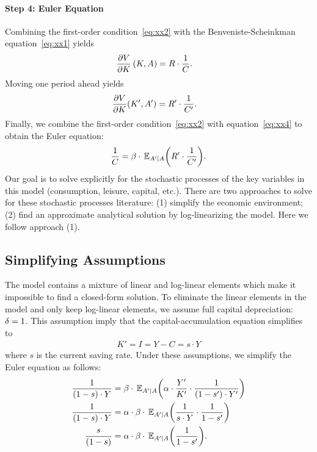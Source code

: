 \documentclass[letterpaper,12pt,leqno]{article}
\begin{document}
\paragraph{Step 4: Euler Equation} Combining the first-order condition~\eqref{eq:xx2} with the Benveniste-Scheinkman equation~\eqref{eq:xx1} yields
\begin{align*}
\frac{\partial V}{\partial K}\left( K,A \right)   &  = R \cdot \frac{1}{C}.
\end{align*}
Moving one period ahead yields
\begin{align}
\frac{\partial V}{\partial K}(K',A')   &  =  R' \cdot  \frac{1}{C'}.\label{eq:xx4}
\end{align}
Finally, we combine the first-order condition~\eqref{eq:xx2} with equation~\eqref{eq:xx4} to obtain the Euler equation:
\begin{equation}
\frac{1}{C}=\b \cdot \E[A'|A]{R'\cdot\frac{1}{C'}}.\label{eq:euler}
\end{equation}
Our goal is to solve explicitly for the stochastic processes of the key variables in this model (consumption, leisure, capital, etc.). There are two approaches to solve for these stochastic processes literature: (1) simplify the economic environment; (2) find an approximate analytical solution by log-linearizing the model. Here we follow approach (1).

\subsection{Simplifying Assumptions}

The model contains a mixture of linear and log-linear elements which make it impossible to find a closed-form solution. To eliminate the linear elements in the model and only keep log-linear elements, we assume full capital depreciation: $\delta=1$. This assumption imply that the capital-accumulation equation simplifies to
\begin{align*}
K'=I=Y-C=s\cdot Y
\end{align*}
where $s$ is the current saving rate. Under these assumptions, we simplify the Euler equation as follows:
\begin{align*}
\frac{1}{\bp{1-s}\cdot Y}&=\b\cdot \E[A'|A]{\a\cdot \frac{Y'}{K'}\cdot \frac{1}{\bp{1-s'} \cdot  Y'}}\\
\frac{1}{\bp{1-s}\cdot Y}&=\a\cdot \b\cdot \E[A'|A]{\frac{1}{s\cdot Y}\cdot \frac{1}{1-s'}} \\
\frac{s}{\bp{1-s} }  &  =\a\cdot \b\cdot \E[A'|A]{  \frac{1}{1-s'}}.
\end{align*}
\end{document}
